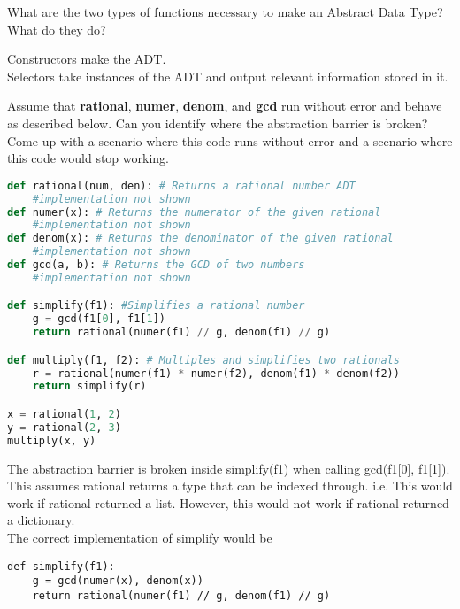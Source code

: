 
\question
What are the two types of functions necessary to make an Abstract Data Type? What do they do?

\begin{solution}[0.25in]
Constructors make the ADT.\\
Selectors take instances of the ADT and output relevant information stored in it.
\end{solution}

\question
Assume that \textbf{rational}, \textbf{numer}, \textbf{denom}, and \textbf{gcd} run without error and behave as described below. Can you identify where the abstraction barrier is broken? Come up with a scenario where this code runs without error and a scenario where this code would stop working.

\begin{lstlisting}[language=Python]
def rational(num, den): # Returns a rational number ADT
    #implementation not shown
def numer(x): # Returns the numerator of the given rational
    #implementation not shown
def denom(x): # Returns the denominator of the given rational
    #implementation not shown
def gcd(a, b): # Returns the GCD of two numbers
    #implementation not shown

def simplify(f1): #Simplifies a rational number
    g = gcd(f1[0], f1[1])
    return rational(numer(f1) // g, denom(f1) // g)

def multiply(f1, f2): # Multiples and simplifies two rationals
    r = rational(numer(f1) * numer(f2), denom(f1) * denom(f2))
    return simplify(r)

x = rational(1, 2)
y = rational(2, 3)
multiply(x, y)
\end{lstlisting}

\begin{solution}
The abstraction barrier is broken inside simplify(f1) when calling gcd(f1[0], f1[1]). This assumes rational returns a type that can be indexed through. i.e. This would work if rational returned a list. However, this would not work if rational returned a dictionary.\\

The correct implementation of simplify would be\\
\begin{verbatim}
def simplify(f1): 
    g = gcd(numer(x), denom(x))
    return rational(numer(f1) // g, denom(f1) // g)
\end{verbatim}
\end{solution}

